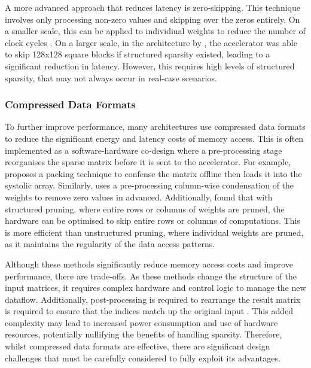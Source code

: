 \documentclass[12pt, a4paper, ukenglish]{article}
\begin{document}
        A more advanced approach that reduces latency is zero-skipping. This technique involves only processing non-zero values and skipping over the zeros entirely. On a smaller scale, this can be applied to individiual weights to reduce the number of clock cycles \cite{duk_kim_24_2020}. On a larger scale, in the architecture by \textcite{kim_fpga_2021}, the accelerator was able to skip 128x128 square blocks if structured sparsity existed, leading to a significant reduction in latency. However, this requires high levels of structured sparsity, that may not always occur in real-case scenarios.

        \subsubsection{Compressed Data Formats} \label{sec: compressed}
        To further improve performance, many architectures use compressed data formats to reduce the significant energy and latency costs of memory access. This is often implemented as a software-hardware co-design where a pre-processing stage reorganises the sparse matrix before it is sent to the accelerator. For example, \textcite{he_sparse-tpu_2020} proposes a packing technique to confense the matrix offline then loads it into the systolic array. Similarly, \textcite{seo_versa_2024} uses a pre-processing column-wise condensation of the weights to remove zero values in advanced. Additionally, \textcite{palacios_systolic_2025,kim_fpga_2021} found that with structured pruning, where entire rows or columns of weights are pruned, the hardware can be optimised to skip entire rows or columns of computations. This is more efficient than unstructured pruning, where individual weights are pruned, as it maintains the regularity of the data access patterns. 

        Although these methods significantly reduce memory access costs and improve performance, there are trade-offs. As these methods change the structure of the input matrices, it requires complex hardware and control logic to manage the new dataflow. Additionally, post-processing is required to rearrange the result matrix is required to ensure that the indices match up the original input \textcite{seo_versa_2024}. This added complexity may lead to increased power consumption and use of hardware resources, potentially nullifying the benefits of handling sparsity. Therefore, whilst compressed data formats are effective, there are significant design challenges that must be carefully considered to fully exploit its advantages.
\end{document}
